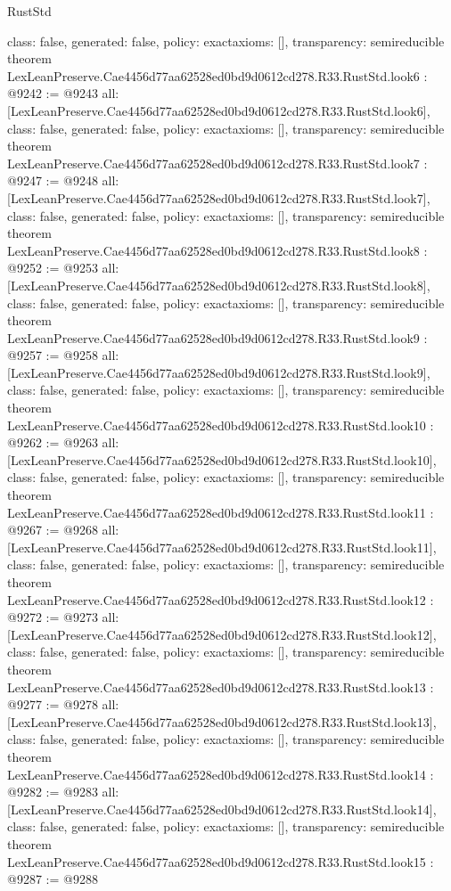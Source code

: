 \begin{lexlean}{RustStd}
\begin{coremodule}
{  class: false,
  generated: false,
  policy: exact{axioms: []},
  transparency: semireducible
}
theorem LexLeanPreserve.Cae4456d77aa62528ed0bd9d0612cd278.R33.RustStd.look6 : @9242 := @9243 {
  all: [LexLeanPreserve.Cae4456d77aa62528ed0bd9d0612cd278.R33.RustStd.look6],
  class: false,
  generated: false,
  policy: exact{axioms: []},
  transparency: semireducible
}
theorem LexLeanPreserve.Cae4456d77aa62528ed0bd9d0612cd278.R33.RustStd.look7 : @9247 := @9248 {
  all: [LexLeanPreserve.Cae4456d77aa62528ed0bd9d0612cd278.R33.RustStd.look7],
  class: false,
  generated: false,
  policy: exact{axioms: []},
  transparency: semireducible
}
theorem LexLeanPreserve.Cae4456d77aa62528ed0bd9d0612cd278.R33.RustStd.look8 : @9252 := @9253 {
  all: [LexLeanPreserve.Cae4456d77aa62528ed0bd9d0612cd278.R33.RustStd.look8],
  class: false,
  generated: false,
  policy: exact{axioms: []},
  transparency: semireducible
}
theorem LexLeanPreserve.Cae4456d77aa62528ed0bd9d0612cd278.R33.RustStd.look9 : @9257 := @9258 {
  all: [LexLeanPreserve.Cae4456d77aa62528ed0bd9d0612cd278.R33.RustStd.look9],
  class: false,
  generated: false,
  policy: exact{axioms: []},
  transparency: semireducible
}
theorem LexLeanPreserve.Cae4456d77aa62528ed0bd9d0612cd278.R33.RustStd.look10 : @9262 := @9263 {
  all: [LexLeanPreserve.Cae4456d77aa62528ed0bd9d0612cd278.R33.RustStd.look10],
  class: false,
  generated: false,
  policy: exact{axioms: []},
  transparency: semireducible
}
theorem LexLeanPreserve.Cae4456d77aa62528ed0bd9d0612cd278.R33.RustStd.look11 : @9267 := @9268 {
  all: [LexLeanPreserve.Cae4456d77aa62528ed0bd9d0612cd278.R33.RustStd.look11],
  class: false,
  generated: false,
  policy: exact{axioms: []},
  transparency: semireducible
}
theorem LexLeanPreserve.Cae4456d77aa62528ed0bd9d0612cd278.R33.RustStd.look12 : @9272 := @9273 {
  all: [LexLeanPreserve.Cae4456d77aa62528ed0bd9d0612cd278.R33.RustStd.look12],
  class: false,
  generated: false,
  policy: exact{axioms: []},
  transparency: semireducible
}
theorem LexLeanPreserve.Cae4456d77aa62528ed0bd9d0612cd278.R33.RustStd.look13 : @9277 := @9278 {
  all: [LexLeanPreserve.Cae4456d77aa62528ed0bd9d0612cd278.R33.RustStd.look13],
  class: false,
  generated: false,
  policy: exact{axioms: []},
  transparency: semireducible
}
theorem LexLeanPreserve.Cae4456d77aa62528ed0bd9d0612cd278.R33.RustStd.look14 : @9282 := @9283 {
  all: [LexLeanPreserve.Cae4456d77aa62528ed0bd9d0612cd278.R33.RustStd.look14],
  class: false,
  generated: false,
  policy: exact{axioms: []},
  transparency: semireducible
}
theorem LexLeanPreserve.Cae4456d77aa62528ed0bd9d0612cd278.R33.RustStd.look15 : @9287 := @9288 {
}
\end{coremodule}
\end{lexlean}
